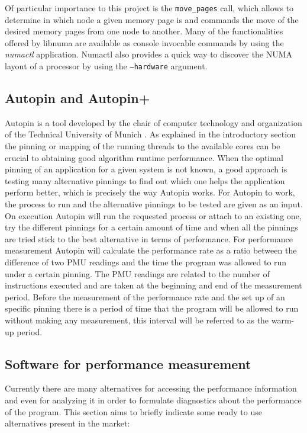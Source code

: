 Of particular importance to this project is the \texttt{move\_pages} call, which allows to determine in which node a given memory page is and commands the move of the desired memory pages from one node to another. Many of the functionalities offered by libnuma are available as console invocable commands by using the \textit{numactl} application. Numactl also provides a quick way to discover the NUMA layout of a processor by using the \texttt{--hardware} argument.

\subsection{Autopin and Autopin+}\label{subsection:autopin2}
Autopin is a tool developed by the chair of computer technology and organization of the Technical University of Munich \cite{autopin}. As explained in the introductory section the pinning or mapping of the running threads to the available cores can be crucial to obtaining good algorithm runtime performance. When the optimal pinning of an application for a given system is not known, a good approach is testing many alternative pinnings to find out which one helps the application perform better, which is precisely the way Autopin works.
For Autopin to work, the process to run and the alternative pinnings to be tested are given as an input. On execution Autopin will run the requested process or attach to an existing one, try the different pinnings for a certain amount of time and when all the pinnings are tried stick to the best alternative in terms of performance. For performance measurement Autopin will calculate the performance rate as a ratio between the difference of two PMU readings and the time the program was allowed to run under a certain pinning. The PMU readings are related to the number of instructions executed and are taken at the beginning and end of the measurement period. Before the measurement of the performance rate and the set up of an specific pinning there is a period of time that the program will be allowed to run without making any measurement, this interval will be referred to as the warm-up period.

\subsection{Software for performance measurement }\label{subsection:software-pm}

Currently there are many alternatives for accessing the performance information and even for analyzing it in order to formulate diagnostics about the performance of the program. This section aims to briefly indicate some ready to use alternatives present in the market:

